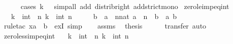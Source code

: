 \begin{isabellebody}
\ \ \ \ \isamarkupfalse%
\ {\isacharparenleft}{\kern0pt}cases\ {\isachardoublequoteopen}k\ {\isacharequal}{\kern0pt}\ {}{\isachardoublequoteclose}{\isacharparenright}{\kern0pt}\ {\isacharparenleft}{\kern0pt}simp{\isacharunderscore}{\kern0pt}all\ add{\isacharcolon}{\kern0pt}\ distrib{\isacharunderscore}{\kern0pt}right\ add{\isacharunderscore}{\kern0pt}strict{\isacharunderscore}{\kern0pt}mono{\isacharparenright}{\kern0pt}\isanewline
{}\isamarkupfalse%
%
\endisatagproof
{\isafoldproof}%
%
\isadelimproof
\isanewline
%
\endisadelimproof
\isanewline
{}\isamarkupfalse%
\ zero{\isacharunderscore}{\kern0pt}le{\isacharunderscore}{\kern0pt}imp{\isacharunderscore}{\kern0pt}eq{\isacharunderscore}{\kern0pt}int{\isacharcolon}{\kern0pt}\isanewline
\ \ \ {\isachardoublequoteopen}k\ {\isasymge}\ {\isacharparenleft}{\kern0pt}{}{\isacharcolon}{\kern0pt}{\isacharcolon}{\kern0pt}int{\isacharparenright}{\kern0pt}{\isachardoublequoteclose}\ \ {\isachardoublequoteopen}{\isasymexists}n{\isachardot}{\kern0pt}\ k\ {\isacharequal}{\kern0pt}\ int\ n{\isachardoublequoteclose}\isanewline
%
\isadelimproof
%
\endisadelimproof
%
\isatagproof
{}\isamarkupfalse%
\ {\isacharminus}{\kern0pt}\isanewline
\ \ \isamarkupfalse%
\ {\isachardoublequoteopen}b\ {\isasymle}\ a\ {\isasymLongrightarrow}\ {\isasymexists}n{\isacharcolon}{\kern0pt}{\isacharcolon}{\kern0pt}nat{\isachardot}{\kern0pt}\ a\ {\isacharequal}{\kern0pt}\ n\ {\isacharplus}{\kern0pt}\ b{\isachardoublequoteclose}\ \ a\ b\isanewline
\ \ \ \ \isamarkupfalse%
\ {\isacharparenleft}{\kern0pt}rule{\isacharunderscore}{\kern0pt}tac\ x{\isacharequal}{\kern0pt}{\isachardoublequoteopen}a\ {\isacharminus}{\kern0pt}\ b{\isachardoublequoteclose}\ \ exI{\isacharparenright}{\kern0pt}\ simp\isanewline
\ \ \isamarkupfalse%
\ assms\ \isamarkupfalse%
\ {\isacharquery}{\kern0pt}thesis\isanewline
\ \ \ \ \isamarkupfalse%
\ transfer\ auto\isanewline
{}\isamarkupfalse%
%
\endisatagproof
{\isafoldproof}%
%
\isadelimproof
\isanewline
%
\endisadelimproof
\isanewline
{}\isamarkupfalse%
\ zero{\isacharunderscore}{\kern0pt}less{\isacharunderscore}{\kern0pt}imp{\isacharunderscore}{\kern0pt}eq{\isacharunderscore}{\kern0pt}int{\isacharcolon}{\kern0pt}\isanewline
\ \ \ {\isachardoublequoteopen}k\ {\isachargreater}{\kern0pt}\ {\isacharparenleft}{\kern0pt}{}{\isacharcolon}{\kern0pt}{\isacharcolon}{\kern0pt}int{\isacharparenright}{\kern0pt}{\isachardoublequoteclose}\ \ {\isachardoublequoteopen}{\isasymexists}n{\isachargreater}{\kern0pt}{}{\isachardot}{\kern0pt}\ k\ {\isacharequal}{\kern0pt}\ int\ n{\isachardoublequoteclose}\isanewline

\end{isabellebody}
